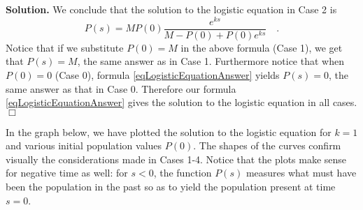 \documentclass[12pt]{book}
\newenvironment{solution}{\medskip\noindent\textbf{Solution.} }{$\Box$}
\begin{document}
\begin{solution}
We conclude that the solution to the logistic equation in Case 2 is
\begin{equation}\label{eqLogisticEquationAnswer}
P(s)=\displaystyle  M P(0) \frac{e^{ks}}{ M -P(0)+ P(0)e^{ks}} \quad .
\end{equation}
Notice that if we substitute $P(0)=M$ in the above formula (Case 1), we get that $P(s)=M$, the same answer as in Case 1. Furthermore notice that when $P(0)=0 $ (Case 0), formula \eqref{eqLogisticEquationAnswer} yields $P(s)=0$, the same answer as that in Case 0. Therefore our formula \eqref{eqLogisticEquationAnswer} gives the solution to the logistic equation in all cases.
\end{solution}


In the graph below, we have plotted the solution to the logistic equation for $k=1$ and various initial population values $P(0)$. The shapes of the curves confirm visually the considerations made in Cases 1-4. Notice that the plots make sense for negative time as well: for $s<0$, the function $P(s)$ measures what must have been the population in the past so as to yield the population present at time $s=0$.
\end{document}
